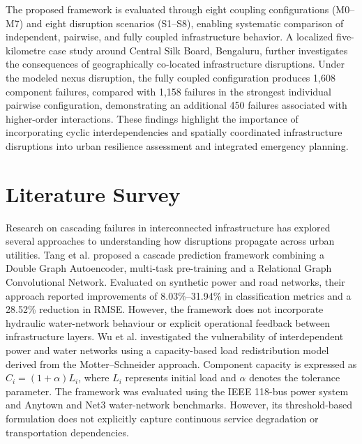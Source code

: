 \documentclass[oneside]{ieeeaccess}
\begin{document}
The proposed framework is evaluated through eight coupling configurations (M0--M7) and eight disruption scenarios (S1--S8), enabling systematic comparison of independent, pairwise, and fully coupled infrastructure behavior. A localized five-kilometre case study around Central Silk Board, Bengaluru, further investigates the consequences of geographically co-located infrastructure disruptions. Under the modeled nexus disruption, the fully coupled configuration produces 1,608 component failures, compared with 1,158 failures in the strongest individual pairwise configuration, demonstrating an additional 450 failures associated with higher-order interactions. These findings highlight the importance of incorporating cyclic interdependencies and spatially coordinated infrastructure disruptions into urban resilience assessment and integrated emergency planning.

\section{Literature Survey}
\label{sec:literature_survey}

Research on cascading failures in interconnected infrastructure has explored several approaches to understanding how disruptions propagate across urban utilities. Tang et al. \cite{b1} proposed a cascade prediction framework combining a Double Graph Autoencoder, multi-task pre-training and a Relational Graph Convolutional Network. Evaluated on synthetic power and road networks, their approach reported improvements of 8.03\%--31.94\% in classification metrics and a 28.52\% reduction in RMSE. However, the framework does not incorporate hydraulic water-network behaviour or explicit operational feedback between infrastructure layers. Wu et al. \cite{b2} investigated the vulnerability of interdependent power and water networks using a capacity-based load redistribution model derived from the Motter--Schneider approach. Component capacity is expressed as $C_i=(1+\alpha)L_i$, where $L_i$ represents initial load and $\alpha$ denotes the tolerance parameter. The framework was evaluated using the IEEE 118-bus power system and Anytown and Net3 water-network benchmarks. However, its threshold-based formulation does not explicitly capture continuous service degradation or transportation dependencies.
\end{document}
